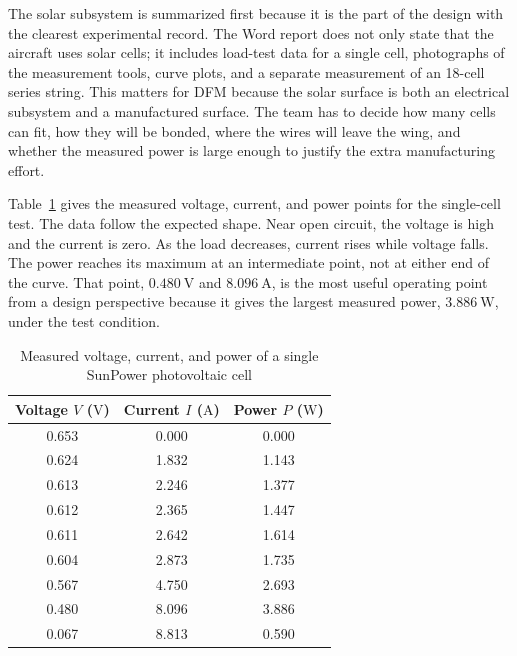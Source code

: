 The solar subsystem is summarized first because it is the part of the design with the clearest experimental record. The Word report does not only state that the aircraft uses solar cells; it includes load-test data for a single cell, photographs of the measurement tools, curve plots, and a separate measurement of an 18-cell series string. This matters for DFM because the solar surface is both an electrical subsystem and a manufactured surface. The team has to decide how many cells can fit, how they will be bonded, where the wires will leave the wing, and whether the measured power is large enough to justify the extra manufacturing effort.

Table~\ref{tab:single-cell-raw-data} gives the measured voltage, current, and power points for the single-cell test. The data follow the expected shape. Near open circuit, the voltage is high and the current is zero. As the load decreases, current rises while voltage falls. The power reaches its maximum at an intermediate point, not at either end of the curve. That point, \(0.480~\mathrm{V}\) and \(8.096~\mathrm{A}\), is the most useful operating point from a design perspective because it gives the largest measured power, \(3.886~\mathrm{W}\), under the test condition.

\begin{table}[htbp]
    \centering
    \caption{Measured voltage, current, and power of a single SunPower photovoltaic cell}
    \label{tab:single-cell-raw-data}
    \begin{tabular}{ccc}
        \toprule
        Voltage \(V\) (\(\mathrm{V}\)) & Current \(I\) (\(\mathrm{A}\)) & Power \(P\) (\(\mathrm{W}\)) \\
        \midrule
        0.653 & 0.000 & 0.000 \\
        0.624 & 1.832 & 1.143 \\
        0.613 & 2.246 & 1.377 \\
        0.612 & 2.365 & 1.447 \\
        0.611 & 2.642 & 1.614 \\
        0.604 & 2.873 & 1.735 \\
        0.567 & 4.750 & 2.693 \\
        0.480 & 8.096 & 3.886 \\
        0.067 & 8.813 & 0.590 \\
        \bottomrule
    \end{tabular}
\end{table}


